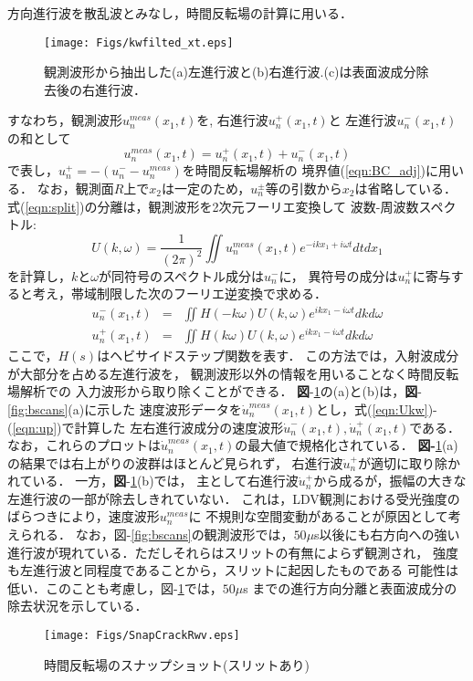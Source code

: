 方向進行波を散乱波とみなし，時間反転場の計算に用いる．
\begin{figure}[bth]
\centering
	\texttt{[image: Figs/kwfilted\_xt.eps]}
	\caption{観測波形から抽出した(a)左進行波と(b)右進行波.(c)は表面波成分除去後の右進行波．}
	\label{fig:kwfilted_xt}
\end{figure}
すなわち，観測波形$u_n^{meas}(x_1,t)$を,
右進行波$u_n^{+}(x_1,t)$と
左進行波$u_n^{-}(x_1,t)$の和として
\begin{equation}
	u_n^{meas}(x_1,t)=u_n^{+}(x_1,t)+u_n^{-}(x_1,t)
	\label{eqn:split}
\end{equation}
で表し，$u_n^+=-(u_n^{-}-u_n^{meas})$を時間反転場解析の
境界値(\ref{eqn:BC_adj})に用いる．
%
なお，観測面$R$上で$x_2$は一定のため，$u_n^{\pm}$等の引数から$x_2$は省略している．
%
式(\ref{eqn:split})の分離は，観測波形を2次元フーリエ変換して
波数-周波数スペクトル:
\begin{equation}
	U(k,\omega)= \frac{1}{(2\pi)^2} \iint u^{meas}_n(x_1,t)e^{-ikx_1+i\omega t}dtdx_1
	\label{eqn:Ukw}
\end{equation}
を計算し，$k$と$\omega$が同符号のスペクトル成分は$u_n^-$に，
異符号の成分は$u_n^+$に寄与すると考え，帯域制限した次のフーリエ逆変換で求める．
\begin{eqnarray}
	u_n^-(x_1,t) &=& \iint H(-k\omega)U(k,\omega)e^{ikx_1-i\omega t}dk d\omega
	\label{eqn:um} \\
	u_n^+(x_1,t) &=& \iint H(k\omega) U(k,\omega)e^{ikx_1-i\omega t}dk d\omega 
	\label{eqn:up}
\end{eqnarray}
ここで，$H(s)$はヘビサイドステップ関数を表す．
この方法では，入射波成分が大部分を占める左進行波を，
観測波形以外の情報を用いることなく時間反転場解析での
入力波形から取り除くことができる．
{\bf 図}-\ref{fig:kwfilted_xt}の(a)と(b)は，{\bf 図}-\ref{fig:bscans}(a)に示した
速度波形データを$\dot u_n^{meas}(x_1,t)$とし，式(\ref{eqn:Ukw})-(\ref{eqn:up})で計算した
左右進行波成分の速度波形$\dot{u}_n^-(x_1,t),\dot{u}_n^+(x_1,t)$である．
なお，これらのプロットは$\dot u_n^{meas}(x_1,t)$の最大値で規格化されている．
{\bf 図-}\ref{fig:kwfilted_xt}(a)の結果では右上がりの波群はほとんど見られず，
右進行波$\dot u_n^+$が適切に取り除かれている．
一方，{\bf 図}-\ref{fig:kwfilted_xt}(b)では，
主として右進行波$\dot u_n^{+}$から成るが，振幅の大きな左進行波の一部が除去しきれていない．
これは，LDV観測における受光強度のばらつきにより，速度波形$u_n^{meas}$に
不規則な空間変動があることが原因として考えられる．
%
なお，{\rm 図}-\ref{fig:bscans}の観測波形では，$50\mu$s以後にも右方向への強い
進行波が現れている．ただしそれらはスリットの有無によらず観測され，
強度も左進行波と同程度であることから，スリットに起因したものである
可能性は低い．このことも考慮し，{\rm 図}-\ref{fig:kwfilted_xt}では，$50\mu$s
までの進行方向分離と表面波成分の除去状況を示している．
%
\begin{figure}[tbh]
\centering
	\texttt{[image: Figs/SnapCrackRwv.eps]}
	\caption{時間反転場のスナップショット(スリットあり)}
	\label{fig:snap_crack_rwv}
\end{figure}
